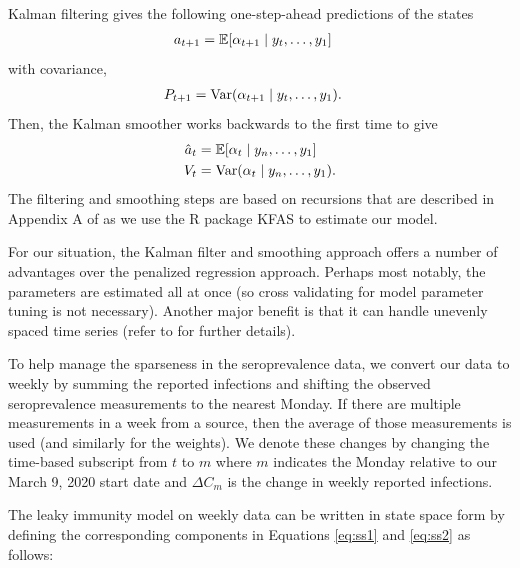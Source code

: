 \documentclass{article}
\begin{document}
Kalman filtering gives the following one-step-ahead predictions of the states
\begin{align*}
a_{t+1} &= \mathbb{E}[\alpha_{t+1}\mid y_t, \dots, y_1] 
\end{align*} with covariance,
\begin{align*}
P_{t+1} &= \operatorname{Var}(\alpha_{t+1} \mid y_t, \dots, y_1).
\end{align*}
Then, the Kalman smoother works backwards to the first time to give
\begin{align}
\hat{a}_t &= \mathbb{E}[\alpha_{t}\mid y_n, \dots, y_1] \label{eq:hatat}\\
V_t &= \operatorname{Var}(\alpha_{t}\mid y_n, \dots, y_1). \label{eq:Vt}
\end{align}
The filtering and smoothing steps are based on recursions that are described in
Appendix A of \citet{helske2017kfas} as we use the R package KFAS to estimate
our model.

For our situation, the Kalman filter and smoothing approach offers a number of
advantages over the penalized regression approach. Perhaps most notably,
 the parameters are estimated all at once (so cross validating for model
parameter tuning is not necessary). Another major benefit is that it can handle 
unevenly spaced time series (refer to \citealp{durbin2012time} for further details).

To help manage the sparseness in the seroprevalence data, we convert our data 
to weekly by summing the reported infections and shifting the observed 
seroprevalence measurements to the nearest Monday. If there are multiple 
measurements in a week from a source, then the average of those 
measurements is used (and similarly for the weights). We denote these changes by 
changing the time-based subscript from $t$ to $m$ where $m$ indicates the Monday 
relative to our March 9, 2020 start date and $\Delta C_m$ is the change in weekly 
reported infections.

The leaky immunity model on weekly data can be written in state space form by 
defining the corresponding components in Equations \ref{eq:ss1} and 
\ref{eq:ss2} as follows:

\end{document}
